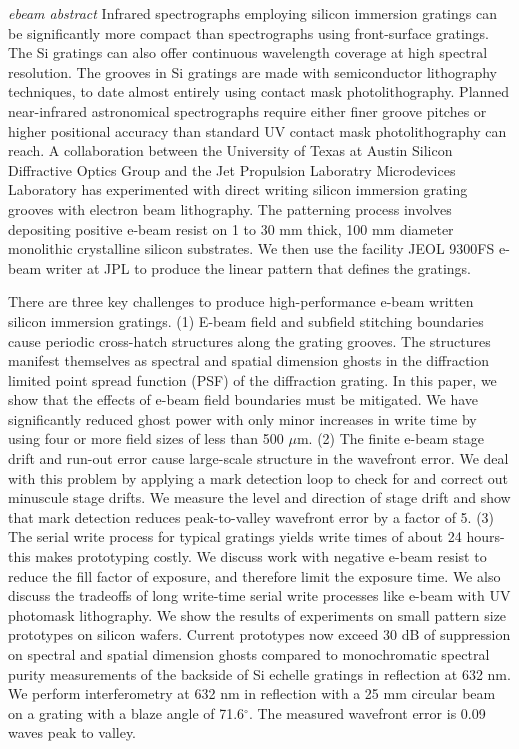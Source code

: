 \documentclass[12pt]{report}	%
\begin{document}
\emph{ebeam abstract}
Infrared spectrographs employing silicon immersion gratings can be significantly more compact than spectrographs using front-surface gratings.  The Si gratings can also offer continuous wavelength coverage at high spectral resolution.  The grooves in Si gratings are made with semiconductor lithography techniques, to date almost entirely using contact mask photolithography.  Planned near-infrared astronomical spectrographs require either finer groove pitches or higher positional accuracy than standard UV contact mask photolithography can reach.  A collaboration between the University of Texas at Austin Silicon Diffractive Optics Group and the Jet Propulsion Laboratry Microdevices Laboratory has experimented with direct writing silicon immersion grating grooves with electron beam lithography.  The patterning process involves depositing positive e-beam resist on 1 to 30 mm thick, 100 mm diameter monolithic crystalline silicon substrates.  We then use the facility JEOL 9300FS e-beam writer at JPL to produce the linear pattern that defines the gratings.

There are three key challenges to produce high-performance e-beam written silicon immersion gratings.  (1) E-beam field and subfield stitching boundaries cause periodic cross-hatch structures along the grating grooves.   The structures manifest themselves as spectral and spatial dimension ghosts in the diffraction limited point spread function (PSF) of the diffraction grating.  In this paper, we show that the effects of e-beam field boundaries must be mitigated.  We have significantly reduced ghost power with only minor increases in write time by using four or more field sizes of less than 500 $\mu$m. (2) The finite e-beam stage drift and run-out error cause large-scale structure in the wavefront error.  We deal with this problem by applying a mark detection loop to check for and correct out minuscule stage drifts.  We measure the level and direction of stage drift and show that mark detection reduces peak-to-valley wavefront error by a factor of 5. (3) The serial write process for typical gratings yields write times of about 24 hours- this makes prototyping costly.  We discuss work with negative e-beam resist to reduce the fill factor of exposure, and therefore limit the exposure time.
We also discuss the tradeoffs of long write-time serial write processes like e-beam with UV photomask lithography.  We show the results of experiments on small pattern size prototypes on silicon wafers.  Current prototypes now exceed 30 dB of suppression on spectral and spatial dimension ghosts compared to monochromatic spectral purity measurements of the backside of Si echelle gratings in reflection at 632 nm.  We perform interferometry at 632 nm in reflection with a 25 mm circular beam on a grating with a blaze angle of 71.6$^\circ$.  The measured wavefront error is 0.09 waves peak to valley.
\end{document}
